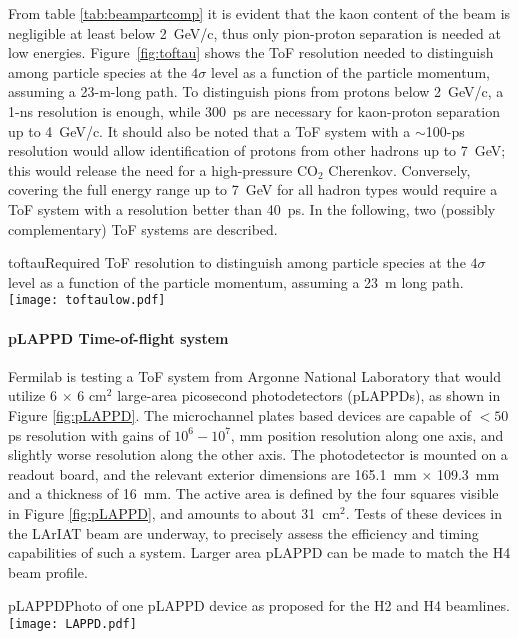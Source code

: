   From table \ref{tab:beampartcomp} it is evident that the kaon content of the beam is negligible at least below 2~GeV/c, thus  only pion-proton separation is needed at low energies. Figure~\ref{fig:toftau} shows the ToF resolution needed to distinguish among particle species at the $4\sigma$ level as a function of the particle momentum, assuming a 23-m-long path. To distinguish pions from protons below 2~GeV/c, a 1-ns resolution is enough, while 300~ps are necessary for kaon-proton separation up to  4~GeV/c. It should also be noted that a ToF system with a $\sim$100-ps resolution would allow identification of protons from other hadrons up to 7~GeV; this would release the need for a %
  high-pressure CO$_2$ Cherenkov. %
  Conversely, covering %
  the full energy range up to 7~GeV for all hadron  types would require a ToF system with a resolution better than 40~ps. %
In the following, two (possibly complementary) ToF systems are described.
\begin{cdrfigure}{toftau}{Required ToF resolution to  distinguish among particle species at the $4\sigma$ level as a function of the particle momentum, assuming a 23~m long path. }
\texttt{[image: toftaulow.pdf]}
\end{cdrfigure}

\paragraph{pLAPPD Time-of-flight system}
Fermilab is testing a ToF system from Argonne National Laboratory that would utilize  
6 $\times$ 6 cm$^2$
large-area picosecond photodetectors (pLAPPDs), as shown in Figure \ref{fig:pLAPPD}.
 The microchannel plates based devices
are capable of $< 50$ ps resolution with gains of $10^6-10^7$,
mm position resolution along one axis, and slightly worse resolution
along the other axis.  The photodetector is mounted on a readout
board, and the relevant exterior dimensions are 165.1~mm $\times$ 109.3~mm and a
thickness of 16~mm. The active area is defined by the four squares visible in Figure \ref{fig:pLAPPD}, and amounts to about 31~cm$^2$. Tests of these devices in the LArIAT beam are underway, to precisely assess the efficiency and timing capabilities of such a system. Larger area pLAPPD can be made to match the H4 beam profile.
\begin{cdrfigure}[pLAPPD]{pLAPPD}{Photo of one pLAPPD device as proposed for the H2 and H4 beamlines.}
\texttt{[image: LAPPD.pdf]}
\end{cdrfigure}

